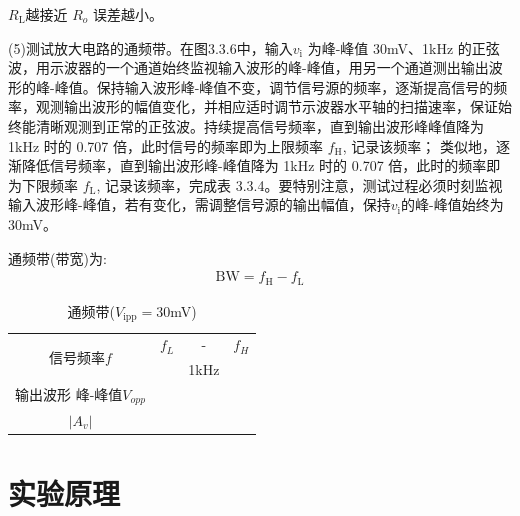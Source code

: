 \documentclass[a4paper,11pt,UTF8]{article}
\numberwithin{equation}{subsection}
\begin{document}
$R_{\mathrm{L}}$越接近 $R_{o}$ 误差越小。

(5)测试放大电路的通频带。在图3.3.6中，输入$v_\mathrm{i}$ 为峰-峰值 30mV、1kHz 的正弦波，用示波器的一个通道始终监视输入波形的峰-峰值，用另一个通道测出输出波形的峰-峰值。保持输入波形峰-峰值不变，调节信号源的频率，逐渐提高信号的频率，观测输出波形的幅值变化，并相应适时调节示波器水平轴的扫描速率，保证始终能清晰观测到正常的正弦波。持续提高信号频率，直到输出波形峰峰值降为 1kHz 时的 0.707 倍，此时信号的频率即为上限频率 $f_\mathrm{H}$, 记录该频率； 类似地，逐渐降低信号频率，直到输出波形峰-峰值降为 1kHz 时的 0.707 倍，此时的频率即为下限频率 $f_\mathrm{L}$, 记录该频率，完成表 3.3.4。要特别注意，测试过程必须时刻监视输入波形峰-峰值，若有变化，需调整信号源的输出幅值，保持$v_\mathrm{i}$的峰-峰值始终为 30mV。

通频带(带宽)为: 
\begin{align}\mathrm{BW}=f_{\mathrm{H}}-f_{\mathrm{L}}\end{align}
\begin{table}[H]
	\centering
	\begin{tabular}{|c|c|c|c|}
		\hline
		\multirow{2}{*}{信号频率$f$} & $f_L$ & - & $f_H$\\
		\cline{2-4}
		&&1kHz&\\	
		\hline
		\shortstack{输出波形\\峰-峰值$V_{opp}$}&&&\\
		\hline
		$|A_v|$&&&\\
		\hline	
	\end{tabular}
	\caption{通频带($V_{\mathrm{ipp}}=30$mV)}
\end{table}
\section{实验原理}
\end{document}

